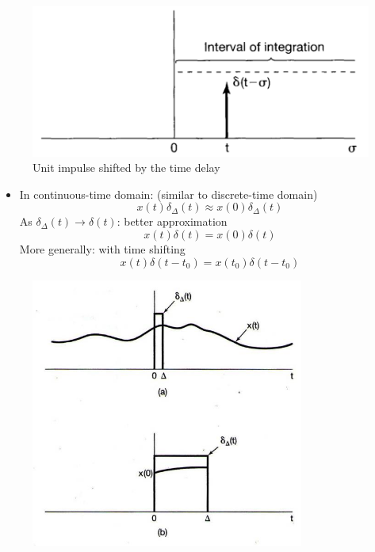 \begin{itemize}
\begin{figure}[H]
 \begin{minipage}[b]{0.45\linewidth} \centering \includegraphics[width=\linewidth]{images/6.7} \end{minipage}
 \caption{Unit impulse shifted by the time delay}
 \end{figure} \end{itemize}

 \begin{minipage}{0.5\textwidth}
 \begin{itemize}
\item In continuous-time domain: (similar to discrete-time domain)
\[ x(t)\delta_{\Delta}(t) \approx x(0)\delta_{\Delta}(t) \]
As $\delta_{\Delta}(t)\rightarrow \delta(t)$: better approximation
\[ x(t)\delta(t) = x(0)\delta(t) \]
More generally: with time shifting
\[ x(t)\delta(t-t_{0}) = x(t_{0})\delta(t-t_{0}) \] \end{itemize}
\end{minipage}\hfill
\begin{minipage}{0.5\textwidth} 
\begin{figure}[H]\centering \includegraphics[width=0.8\textwidth]{images/unitstepdelta}
  \caption{} \end{figure}
 \end{minipage}
 

